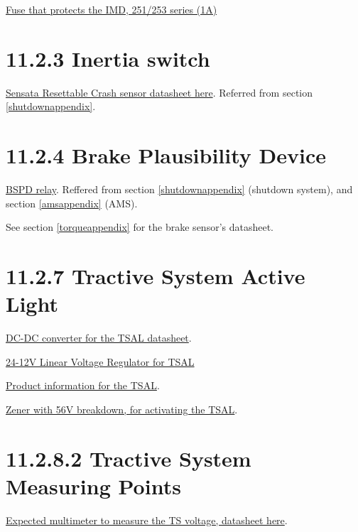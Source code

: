 \documentclass{article}
\begin{document}
\href{http://www.littelfuse.com/~/media/electronics/datasheets/fuses/littelfuse_fuse_251_253_datasheet.pdf.pdf}{Fuse that protects the IMD, 251/253 series (1A)}

\section*{11.2.3 Inertia switch} \label{inertiaappendix}

\href{http://www.sensata.com/download/resettable-crash.pdf}{Sensata Resettable Crash sensor datasheet here}. Referred from section \ref{shutdownappendix}.

\section*{11.2.4 Brake Plausibility Device} \label{bspdappendix}

\href{http://www.mouser.com/ds/2/418/te_ENG_DS_OJ_OJE_series_relay_data_sheet_E_0412-309476.pdf}{BSPD relay}. Reffered from section \ref{shutdownappendix} (shutdown system), and section \ref{amsappendix} (AMS).

See section \ref{torqueappendix} for the brake sensor's datasheet.

\section*{11.2.7 Tractive System Active Light}

\href{http://www.digikey.com/product-detail/en/murata-power-solutions-inc/RUW15SL24C/811-2784-ND/3723979}{DC-DC converter for the TSAL datasheet}.

\href{http://www.digikey.com/product-detail/en/recom-power/R-78W12-0.5/945-2204-ND/4930588}{24-12V Linear Voltage Regulator for TSAL}

\href{https://www.superbrightleds.com/moreinfo/oval-marker-lamps/oval-led-truck-trailer-light-with-reflectorized-lens-4in-led-marker-clearance-light-with-4-leds/580/#/tab/Specifications}{Product information for the TSAL}.

\href{http://www.onsemi.com/pub_link/Collateral/1N5333B-D.PDF}{Zener with 56V breakdown, for activating the TSAL}.

\section*{11.2.8.2 Tractive System Measuring Points} \label{tsmpappendix}

\href{https://www.gossenmetrawatt.com/resources/tt/hit27/db_gb.pdf}{Expected multimeter to measure the TS voltage, datasheet here}.
\end{document}
